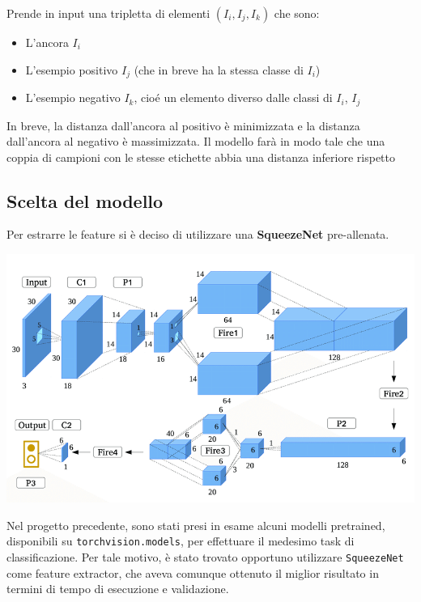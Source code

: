 \documentclass[11pt]{article}
\begin{document}
Prende in input una tripletta di elementi $(I_i, I_j, I_k)$ che sono:

\begin{itemize}
    \item L'ancora $I_i$ 
    \item L'esempio positivo $I_j$ (che in breve ha la stessa classe di $I_i$)
    \item L'esempio negativo $I_k$, cioé un elemento diverso dalle classi di $I_i$, $I_j$
\end{itemize}

In breve, la distanza dall'ancora al positivo è minimizzata e la distanza dall'ancora al negativo è massimizzata.
Il modello farà in modo tale che una coppia di campioni con le stesse etichette abbia una distanza inferiore rispetto

\subsection{Scelta del modello}

Per estrarre le feature si è deciso di utilizzare una \textbf{SqueezeNet} pre-allenata.

\begin{center}
    \begin{minipage}{0.48\linewidth}
    \includegraphics[width=\linewidth]{03.png}
    \end{minipage}
\end{center}

Nel progetto precedente, sono stati presi in esame alcuni modelli pretrained, disponibili su
\texttt{torchvision.models}, per effettuare il medesimo task di classificazione. Per tale motivo,
è stato trovato opportuno utilizzare \texttt{SqueezeNet} come feature
extractor, che aveva comunque ottenuto il miglior risultato in termini di tempo di esecuzione e validazione.
\end{document}
